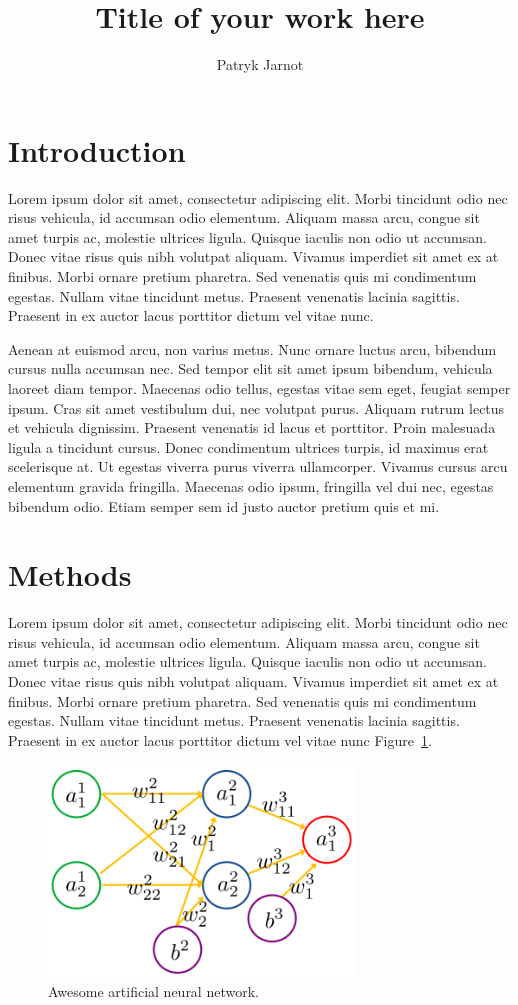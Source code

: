 \documentclass[twocolumn]{miniclass}
\title{Title of your work here}
\author[1,$\ast$]{Patryk Jarnot}
\affil[1]{Department of Computer Network and Systems, Silesian University of Technology}
\affil[$\ast$]{patryk.jarnot@polsl.pl}
\date{}
\begin{document}
\maketitle


\section{Introduction}
Lorem ipsum dolor sit amet, consectetur adipiscing elit. Morbi tincidunt odio nec risus vehicula, id accumsan odio elementum. Aliquam massa arcu, congue sit amet turpis ac, molestie ultrices ligula. Quisque iaculis non odio ut accumsan. Donec vitae risus quis nibh volutpat aliquam. Vivamus imperdiet sit amet ex at finibus. Morbi ornare pretium pharetra. Sed venenatis quis mi condimentum egestas. Nullam vitae tincidunt metus. Praesent venenatis lacinia sagittis. Praesent in ex auctor lacus porttitor dictum vel vitae nunc.

Aenean at euismod arcu, non varius metus. Nunc ornare luctus arcu, bibendum cursus nulla accumsan nec. Sed tempor elit sit amet ipsum bibendum, vehicula laoreet diam tempor. Maecenas odio tellus, egestas vitae sem eget, feugiat semper ipsum. Cras sit amet vestibulum dui, nec volutpat purus. Aliquam rutrum lectus et vehicula dignissim. Praesent venenatis id lacus et porttitor. Proin malesuada ligula a tincidunt cursus. Donec condimentum ultrices turpis, id maximus erat scelerisque at. Ut egestas viverra purus viverra ullamcorper. Vivamus cursus arcu elementum gravida fringilla. Maecenas odio ipsum, fringilla vel dui nec, egestas bibendum odio. Etiam semper sem id justo auctor pretium quis et mi.

\section{Methods}
Lorem ipsum dolor sit amet, consectetur adipiscing elit. Morbi tincidunt odio nec risus vehicula, id accumsan odio elementum. Aliquam massa arcu, congue sit amet turpis ac, molestie ultrices ligula. Quisque iaculis non odio ut accumsan. Donec vitae risus quis nibh volutpat aliquam. Vivamus imperdiet sit amet ex at finibus. Morbi ornare pretium pharetra. Sed venenatis quis mi condimentum egestas. Nullam vitae tincidunt metus. Praesent venenatis lacinia sagittis. Praesent in ex auctor lacus porttitor dictum vel vitae nunc Figure~\ref{fig:ann}.

\begin{figure}[H]
    \centering
    \includegraphics[width=230pt]{resources/ann.png}
    \caption{Awesome artificial neural network.}
    \label{fig:ann}
\end{figure}
\end{document}
